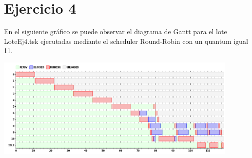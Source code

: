 \section{Ejercicio 4}



En el siguiente gráfico se puede observar el diagrama de Gantt para el lote LoteEj4.tsk ejecutadas mediante el scheduler Round-Robin con un quantum igual 11.

\begin {center}
\includegraphics[width=12cm]{../simusched/outputs/outEj4.png}
\end {center}

